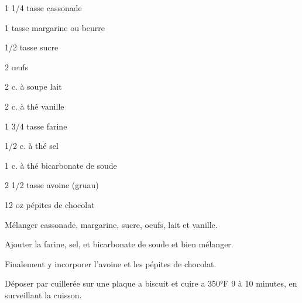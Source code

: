 %
%   
%   
%   
%




\totaltime{}


\begin{ingredients}
    \item 1 1/4 tasse cassonade
    \item 1 tasse margarine ou beurre
    \item 1/2 tasse sucre
    \item 2 œufs
    \item 2 c. à soupe lait
    \item 2 c. à thé vanille
    \item 1 3/4 tasse farine
    \item 1/2 c. à thé sel
    \item 1 c. à thé bicarbonate de soude
    \item 2 1/2 tasse avoine (gruau)
    \item 12 oz pépites de chocolat
\end{ingredients}

\begin{steps}
    \item Mélanger cassonade, margarine, sucre, oeufs, lait et vanille.
    \item Ajouter la farine, sel, et bicarbonate de soude et bien mélanger.
    \item Finalement y incorporer l'avoine et les pépites de chocolat.
    \item Déposer par cuillerée sur une plaque a biscuit et cuire a 350°F 9 à 10 minutes, en surveillant la cuisson.
\end{steps}
